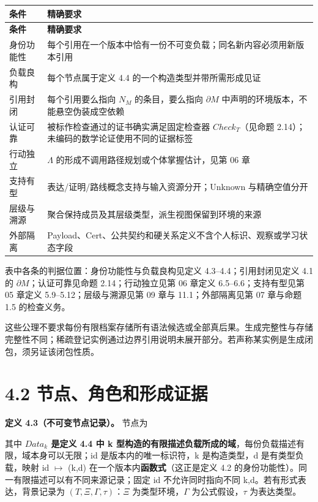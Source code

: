 \documentclass[UTF8,a4paper,zihao=-4,fontset=windows,openany]{ctexbook}
\newcommand{\mcsdisplay}[1]{%
  \par\addvspace{0.7em}%
  \sbox{\mcsmathbox}{\ensuremath{\displaystyle #1}}%
  \ifdim\wd\mcsmathbox>\linewidth
    \noindent\resizebox{\linewidth}{!}{\usebox{\mcsmathbox}}%
  \else
    \noindent\hspace*{\fill}\usebox{\mcsmathbox}\hspace*{\fill}%
  \fi
  \par\addvspace{0.7em}%
}
\def\ensuremath#1{#1}%
\def\mathrm#1{#1}%
\begin{document}
\begingroup\small\setlength{\tabcolsep}{4pt}
\begin{longtable}{>{\raggedright\arraybackslash}p{}>{\raggedright\arraybackslash}p{}}
\toprule
\textbf{条件} & \textbf{精确要求} \\
\midrule
\endfirsthead
\toprule
\textbf{条件} & \textbf{精确要求} \\
\midrule
\endhead
\bottomrule
\endfoot
\bottomrule
\endlastfoot
身份功能性 & 每个引用在一个版本中恰有一份不可变负载；同名新内容必须用新版本引用 \\
负载良构 & 每个节点属于定义 4.4 的一个构造类型并带所需形成见证 \\
引用封闭 & 每个引用要么指向 \(N_M\) 的条目，要么指向 \(\partial M\) 中声明的环境版本，不能悬空伪装成空依赖 \\
认证可靠 & 被标作检查通过的证书确实满足固定检查器 \(\mathrm{Check}_T\)（见命题 2.14）；未编码的数学论证使用不同的证据标签 \\
行动独立 & \(\Lambda\) 的形成不调用路径规划或个体掌握估计，见第 06 章 \\
支持有型 & 表达/证明/路线概念支持与输入资源分开；Unknown 与精确空值分开 \\
层级与溯源 & 聚合保持成员及其层级类型，派生视图保留到环境的来源 \\
外部隔离 & Payload、Cert、公共契约和硬关系定义不含个人标识、观察或学习状态字段 \\
\end{longtable}
\endgroup

表中各条的判据位置：身份功能性与负载良构见定义 4.3–4.4；引用封闭见定义 4.1 的 \(\partial M\)；认证可靠见命题 2.14；行动独立见第 06 章定义 6.5–6.6；支持有型见第 05 章定义 5.9–5.12；层级与溯源见第 09 章与 11.1；外部隔离见第 07 章与命题 1.5 的检查义务。

这些公理不要求每份有限档案存储所有语法候选或全部真后果。生成完整性与存储完整性不同；稀疏登记实例通过边界引用说明未展开部分。若声称某实例是生成闭包，须另证该闭包性质。

\section{4.2 节点、角色和形成证据}
\textbf{定义 4.3（不可变节点记录）。} 节点为


\mcsdisplay{n=(id,k,d),\qquad d\in Data_k.}
\noindent 其中 \textbf{\(\mathrm{Data}_k\) 是定义 4.4 中 k 型构造的有限描述负载所成的域}，每份负载描述有限，域本身可以无限；id 是版本内的唯一标识符，k 是构造类型，d 是有类型负载，映射 id \(\mapsto\) (k,d) 在一个版本内\textbf{函数式}（这正是定义 4.2 的身份功能性）。同一有限描述可以有不同来源记录；固定 id 不允许同时指向不同 k,d。若有形式表达，背景记录为 \((T,\Xi,\Gamma,\tau)\)：\(\Xi\) 为类型环境，\(\Gamma\) 为公式假设，\(\tau\) 为表达类型。
\end{document}

